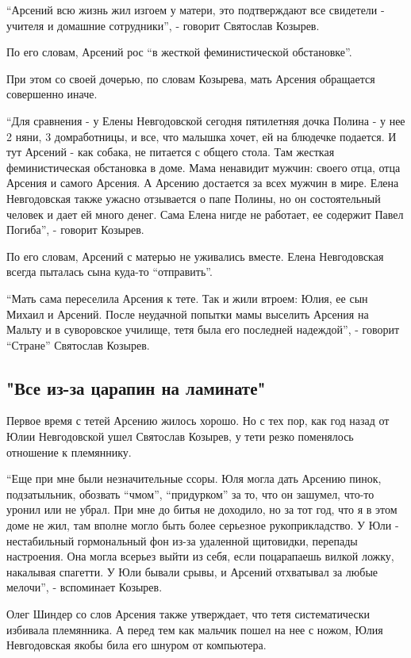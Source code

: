 “Арсений всю жизнь жил изгоем у матери, это подтверждают все свидетели -
учителя и домашние сотрудники”, - говорит Святослав Козырев. 

По его словам, Арсений рос “в жесткой феминистической обстановке”. 

При этом со своей дочерью, по словам Козырева, мать Арсения обращается
совершенно иначе.

“Для сравнения - у Елены Невгодовской сегодня пятилетняя дочка Полина - у нее 2
няни, 3 домработницы, и все, что малышка хочет, ей на блюдечке подается. И тут
Арсений - как собака, не питается с общего стола. Там жесткая феминистическая
обстановка в доме. Мама ненавидит мужчин: своего отца, отца Арсения и самого
Арсения. А Арсению достается за всех мужчин в мире. Елена Невгодовская также
ужасно отзывается о папе Полины, но он состоятельный человек и дает ей много
денег. Сама Елена нигде не работает, ее содержит Павел Погиба”, - говорит
Козырев.

По его словам, Арсений с матерью не уживались вместе. Елена Невгодовская всегда
пыталась сына куда-то “отправить”.

“Мать сама переселила Арсения к тете. Так и жили втроем: Юлия, ее сын Михаил и
Арсений. После неудачной попытки мамы выселить Арсения на Мальту и в
суворовское училище, тетя была его последней надеждой”, - говорит “Стране”
Святослав Козырев.

\subsection{"Все из-за царапин на ламинате"}

Первое время с тетей Арсению жилось хорошо. Но с тех пор, как год назад от Юлии
Невгодовской ушел Святослав Козырев, у тети резко поменялось отношение к
племяннику. 

“Еще при мне были незначительные ссоры. Юля могла дать Арсению пинок,
подзатыльник, обозвать “чмом”, “придурком” за то, что он зашумел, что-то уронил
или не убрал. При мне до битья не доходило, но за тот год, что я в этом доме не
жил, там вполне могло быть более серьезное рукоприкладство. У Юли -
нестабильный гормональный фон из-за удаленной щитовидки, перепады настроения.
Она могла всерьез выйти из себя, если поцарапаешь вилкой ложку, накалывая
спагетти. У Юли бывали срывы, и Арсений отхватывал за любые мелочи”, -
вспоминает Козырев.

Олег Шиндер со слов Арсения также утверждает, что тетя систематически избивала
племянника. А перед тем как мальчик пошел на нее с ножом, Юлия Невгодовская
якобы била его шнуром от компьютера.

